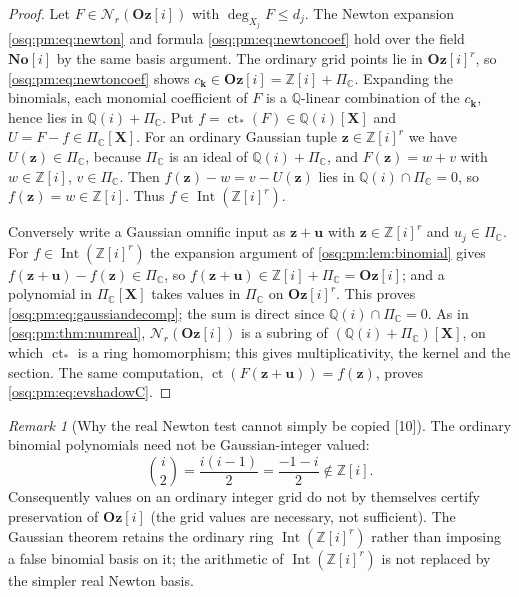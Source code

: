 \documentclass[11pt,letterpaper]{article}
\numberwithin{equation}{section}
\theoremstyle{definition}
\theoremstyle{remark}
\newtheorem{remark}[remark]{Remark}
\theoremstyle{plain}
\newcommand{\No}{\mathbf{No}}
\newcommand{\Oz}{\mathbf{Oz}}
\newcommand{\SC}{\No[i]}
\newcommand{\GOz}{\Oz[i]}
\newcommand{\Z}{\mathbb Z}
\newcommand{\Q}{\mathbb Q}
\newcommand{\C}{\mathbb C}
\newcommand{\ct}{\operatorname{ct}}
\newcommand{\Int}{\operatorname{Int}}
\newcommand{\Num}{\mathscr N}
\newcommand{\src}[1]{\textup{\textsf{[#1]}}}
\begin{document}
\begin{proof}
Let $F\in\Num_r(\GOz)$ with $\deg_{X_j}F\le d_j$. The Newton expansion
\eqref{osq:pm:eq:newton} and formula \eqref{osq:pm:eq:newtoncoef} hold over the field
$\SC$ by the same basis argument. The ordinary grid points lie in $\GOz^r$, so
\eqref{osq:pm:eq:newtoncoef} shows $c_{\mathbf k}\in\GOz=\Z[i]+\Pi_\C$. Expanding the
binomials, each monomial coefficient of $F$ is a $\Q$-linear combination of the
$c_{\mathbf k}$, hence lies in $\Q(i)+\Pi_\C$. Put $f=\ct_*(F)\in\Q(i)[\mathbf X]$ and
$U=F-f\in\Pi_\C[\mathbf X]$. For an ordinary Gaussian tuple $\mathbf z\in\Z[i]^r$ we have
$U(\mathbf z)\in\Pi_\C$, because $\Pi_\C$ is an ideal of $\Q(i)+\Pi_\C$, and
$F(\mathbf z)=w+v$ with $w\in\Z[i]$, $v\in\Pi_\C$. Then $f(\mathbf z)-w=v-U(\mathbf z)$
lies in $\Q(i)\cap\Pi_\C=0$, so $f(\mathbf z)=w\in\Z[i]$. Thus $f\in\Int(\Z[i]^r)$.

Conversely write a Gaussian omnific input as $\mathbf z+\mathbf u$ with
$\mathbf z\in\Z[i]^r$ and $u_j\in\Pi_\C$. For $f\in\Int(\Z[i]^r)$ the expansion argument
of \cref{osq:pm:lem:binomial} gives $f(\mathbf z+\mathbf u)-f(\mathbf z)\in\Pi_\C$, so
$f(\mathbf z+\mathbf u)\in\Z[i]+\Pi_\C=\GOz$; and a polynomial in $\Pi_\C[\mathbf X]$
takes values in $\Pi_\C$ on $\GOz^r$. This proves \eqref{osq:pm:eq:gaussiandecomp};
the sum is direct since $\Q(i)\cap\Pi_\C=0$. As in \cref{osq:pm:thm:numreal},
$\Num_r(\GOz)$ is a subring of $(\Q(i)+\Pi_\C)[\mathbf X]$, on which $\ct_*$ is a ring
homomorphism; this gives multiplicativity, the kernel and the section. The same
computation, $\ct(F(\mathbf z+\mathbf u))=f(\mathbf z)$, proves
\eqref{osq:pm:eq:evshadowC}.
\end{proof}

\begin{remark}[Why the real Newton test cannot simply be copied \src{10}]
\label{osq:pm:rem:gaussnewton}
The ordinary binomial polynomials need not be Gaussian-integer valued:
\[
 \binom i2=\frac{i(i-1)}2=\frac{-1-i}{2}\notin\Z[i].
\]
Consequently values on an ordinary integer grid do not by themselves certify
preservation of $\GOz$ (the grid values are necessary, not sufficient). The Gaussian
theorem retains the ordinary ring $\Int(\Z[i]^r)$ rather than imposing a false binomial
basis on it; the arithmetic of $\Int(\Z[i]^r)$ is not replaced by the simpler real
Newton basis.
\end{remark}
\end{document}
